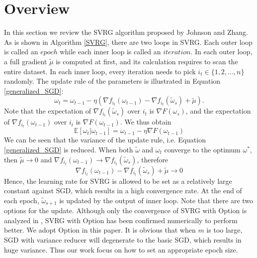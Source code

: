 \documentclass[conference]{IEEEtran}
\begin{document}
\section{Overview}
\label{svrg_review}
 In this section we review the SVRG algorithm proposed by Johnson and Zhang\citep{Johnson:9MAvkbgy}.  As is shown in Algorithm \ref{SVRG}, there are two loops in SVRG. Each outer loop is called an $epoch$ while each inner loop is called an $iteration$. In each outer loop, a full gradient $\tilde{\mu}$ is computed at first, and its calculation requires to scan the entire dataset. In each inner loop,  every iteration needs to pick $i_t\in\{1, 2, ..., n\}$ randomly. The update rule of the parameters is illustrated in Equation \ref{generalized_SGD}:
\begin{equation}
\label{generalized_SGD}
\omega_t = \omega_{t-1} - \eta(\nabla f_{i_t}(\omega_{t-1}) - \nabla f_{i_t}(\tilde{\omega}_s)+\tilde{\mu}).
\end{equation}
Note that the expectation of $\nabla f_{i_t}(\tilde{\omega}_s)$ over $i_t$ is $\nabla F(\omega_{s})$, and the expectation of $\nabla f_{i_t}(\omega_{t-1})$ over $i_t$ is $\nabla F(\omega_{t-1})$. We thus obtain
\begin{equation}
\mathbb{E}[\omega_{t} | \omega_{t-1}] = \omega_{t-1} - \eta\nabla F(\omega_{t-1})
\end{equation}
 We can be seen that the variance of the update rule, i.e. Equation \ref{generalized_SGD} is reduced. When both $\tilde{\omega}$ and $\omega_t$ converge to the optimum $\omega^*$, then $\tilde{\mu}\rightarrow0$ and $\nabla f_{i_t}(\omega_{t-1})\rightarrow\nabla f_{i_t}(\tilde{\omega}_s)$, therefore
 $$\nabla f_{i_t}(\omega_{t-1}) - \nabla f_{i_t}(\tilde{\omega}_s)+\tilde{\mu}\rightarrow0$$
 Hence, the learning rate for SVRG is allowed to be set as a relatively large constant against SGD, which results in a high convergence rate.
At the end of each epoch, $\tilde\omega_{s+1}$ is updated by the output of inner loop. Note that there are two options for the update. Although only the convergence of SVRG with Option \uppercase\expandafter{} is analyzed in \citep{Johnson:9MAvkbgy}, SVRG with Option \uppercase\expandafter{} has been confirmed numerically to perform better. We adopt Option \uppercase\expandafter{} in this paper. It is obvious that when $m$ is too large, SGD with variance reducer will degenerate to the basic SGD, which results in huge variance. Thus our work focus on how to set an appropriate epoch size.
 
\end{document}
